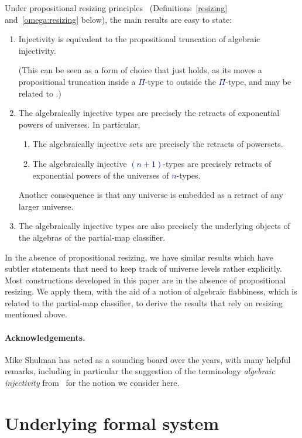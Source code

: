 \documentclass[10pt]{article}
\newcommand{\db}{\textcolor{darkblue}}
\newcommand{\m}[1]{\db{$#1$}}
\theoremstyle{definition}
\begin{document}
Under propositional resizing principles~\cite{hottbook}
(Definitions~\ref{resizing} and~\ref{omega:resizing} below), the main
results are easy to state:
\begin{enumerate}
\item Injectivity is equivalent to the propositional truncation of
  algebraic injectivity.

  (This can be seen as a form of choice that
  just holds, as its moves a propositional truncation inside a
  \m{\Pi}-type to outside the \m{\Pi}-type, and may be related to
  \cite{kenney:2011}.)
   \item The algebraically injective types are precisely the retracts of
     exponential powers of universes. In particular,
       \begin{enumerate}
       \item The algebraically injective sets are precisely the
         retracts of powersets.

       \item The algebraically injective \m{(n+1)}-types are precisely
         retracts of exponential powers of the universes of \m{n}-types.
       \end{enumerate}
     Another consequence is that any universe is embedded as a retract of any
     larger universe.
   \item The algebraically injective types are also precisely the
       underlying objects of the algebras of the partial-map
       classifier.
\end{enumerate}
In the absence of propositional resizing, we have similar results
which have subtler statements that need to keep track of universe
levels rather explicitly.
%
Most constructions developed in this paper are in the absence of
propositional resizing. We apply them, with the aid of a notion of
algebraic flabbiness, which is related to the partial-map classifier,
to derive the results that rely on resizing mentioned above.

\paragraph{Acknowledgements.} Mike Shulman has acted as a sounding
board over the years, with many helpful remarks, including in
particular the suggestion of the terminology \emph{algebraic
  injectivity} from~\cite{bourke:2017} for the notion we consider
here.

\section{Underlying formal system} \label{foundations}
\end{document}
